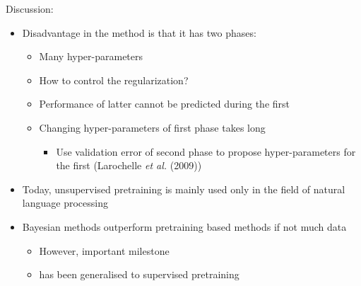 \begin{frame}
Discussion:
\begin{itemize}
\item Disadvantage in the method is that it has two phases:
\begin{itemize}
\item Many hyper-parameters
\item How to control the regularization?
\item Performance of latter cannot be predicted during the first
\item Changing hyper-parameters of first phase takes long
\begin{itemize}
\item Use validation error of second phase to propose hyper-parameters for the first (Larochelle \textit{et al.} (2009))
\end{itemize}
\end{itemize}
\item Today, unsupervised pretraining is mainly used only in the field of natural language processing
\item Bayesian methods outperform pretraining based methods if not much data
\begin{itemize}
\item However, important milestone
\item has been generalised to supervised pretraining
\end{itemize}
\end{itemize}
\end{frame}
